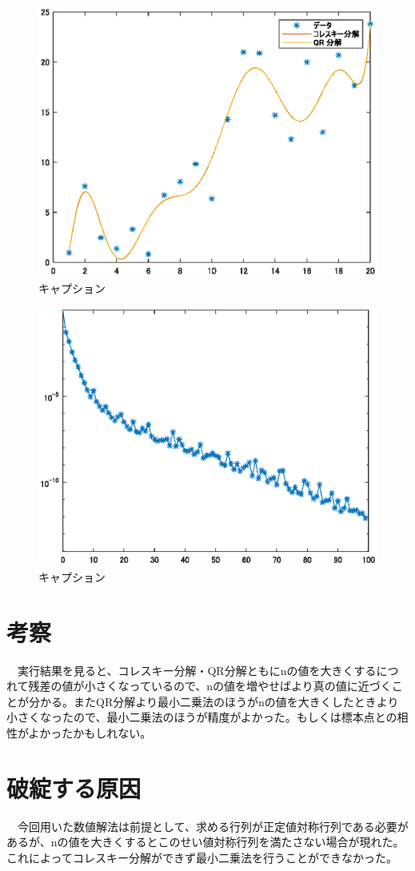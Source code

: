 \documentclass[titlepage, a4paper, 11pt, dvipdfmx]{jsarticle}
\begin{document}
  \begin{figure}[H]
    \begin{center}%
      \includegraphics[width=13.5cm]{./graphics/saisyounijouhou/11.eps}
    \caption{キャプション}
    \label{Label}%
    \end{center}
  \end{figure}


  \begin{figure}[H]
    \begin{center}%
      \includegraphics[width=13.5cm]{./graphics/100.eps}
    \caption{キャプション}
    \label{Label}%
    \end{center}
  \end{figure}

\section{考察}
　実行結果を見ると、コレスキー分解・QR分解ともにnの値を大きくするにつれて残差の値が小さくなっているので、nの値を増やせばより真の値に近づくことが分かる。またQR分解より最小二乗法のほうがnの値を大きくしたときより小さくなったので、最小二乗法のほうが精度がよかった。もしくは標本点との相性がよかったかもしれない。

\section{破綻する原因}
　今回用いた数値解法は前提として、求める行列が正定値対称行列である必要があるが、nの値を大きくするとこのせい値対称行列を満たさない場合が現れた。これによってコレスキー分解ができず最小二乗法を行うことができなかった。
\end{document}
